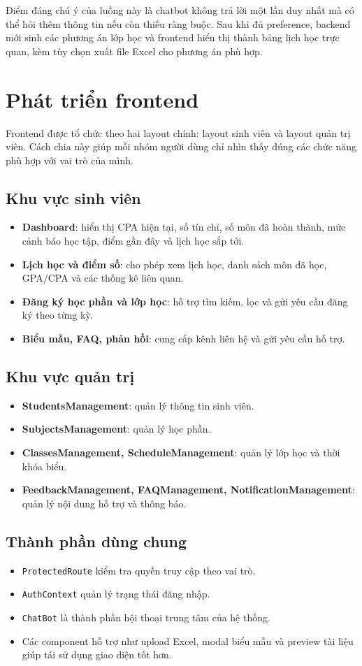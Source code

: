 \documentclass[12pt,a4paper]{report}
\begin{document}
Điểm đáng chú ý của luồng này là chatbot không trả lời một lần duy nhất mà có thể hỏi thêm thông tin nếu còn thiếu ràng buộc. Sau khi đủ preference, backend mới sinh các phương án lớp học và frontend hiển thị thành bảng lịch học trực quan, kèm tùy chọn xuất file Excel cho phương án phù hợp.

\section{Phát triển frontend}
Frontend được tổ chức theo hai layout chính: layout sinh viên và layout quản trị viên. Cách chia này giúp mỗi nhóm người dùng chỉ nhìn thấy đúng các chức năng phù hợp với vai trò của mình.

\subsection{Khu vực sinh viên}
\begin{itemize}
    \item \textbf{Dashboard}: hiển thị CPA hiện tại, số tín chỉ, số môn đã hoàn thành, mức cảnh báo học tập, điểm gần đây và lịch học sắp tới.
    \item \textbf{Lịch học và điểm số}: cho phép xem lịch học, danh sách môn đã học, GPA/CPA và các thống kê liên quan.
    \item \textbf{Đăng ký học phần và lớp học}: hỗ trợ tìm kiếm, lọc và gửi yêu cầu đăng ký theo từng kỳ.
    \item \textbf{Biểu mẫu, FAQ, phản hồi}: cung cấp kênh liên hệ và gửi yêu cầu hỗ trợ.
\end{itemize}

\subsection{Khu vực quản trị}
\begin{itemize}
    \item \textbf{StudentsManagement}: quản lý thông tin sinh viên.
    \item \textbf{SubjectsManagement}: quản lý học phần.
    \item \textbf{ClassesManagement, ScheduleManagement}: quản lý lớp học và thời khóa biểu.
    \item \textbf{FeedbackManagement, FAQManagement, NotificationManagement}: quản lý nội dung hỗ trợ và thông báo.
\end{itemize}

\subsection{Thành phần dùng chung}
\begin{itemize}
    \item \texttt{ProtectedRoute} kiểm tra quyền truy cập theo vai trò.
    \item \texttt{AuthContext} quản lý trạng thái đăng nhập.
    \item \texttt{ChatBot} là thành phần hội thoại trung tâm của hệ thống.
    \item Các component hỗ trợ như upload Excel, modal biểu mẫu và preview tài liệu giúp tái sử dụng giao diện tốt hơn.
\end{itemize}
\end{document}

